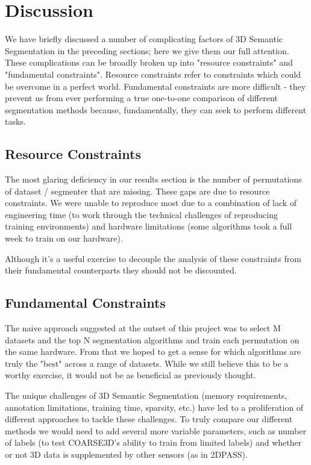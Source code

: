 \section{Discussion}
\label{chap:discussion}

We have briefly discussed a number of complicating factors of 3D Semantic Segmentation in the preceding sections; here we give them our full attention. These complications can be broadly broken up into "resource constraints" and "fundamental constraints". Resource constraints refer to constraints which could be overcome in a perfect world. Fundamental constraints are more difficult - they prevent us from ever performing a true one-to-one comparison of different segmentation methods because, fundamentally, they can seek to perform different tasks.

\subsection{Resource Constraints}
\label{resource-constraints}

The most glaring deficiency in our results section is the number of permutations of dataset / segmenter that are missing. These gaps are due to resource constraints. We were unable to reproduce most due to a combination of lack of engineering time (to work through the technical challenges of reproducing training environments) and hardware limitations (some algorithms took a full week to train on our hardware).

Although it's a useful exercise to decouple the analysis of these constraints from their fundamental counterparts they should not be discounted.

\subsection{Fundamental Constraints}
\label{fundamental-constraints}

The naive approach suggested at the outset of this project was to select M datasets and the top N segmentation algorithms and train each permutation on the same hardware. From that we hoped to get a sense for which algorithms are truly the "best" across a range of datasets. While we still believe this to be a worthy exercise, it would not be as beneficial as previously thought.

The unique challenges of 3D Semantic Segmentation (memory requirements, annotation limitations, training time, sparsity, etc.) have led to a proliferation of different approaches to tackle these challenges. To truly compare our different methods we would need to add several more variable parameters, such as number of labels (to test COARSE3D's ability to train from limited labels) and whether or not 3D data is supplemented by other sensors (as in 2DPASS).

